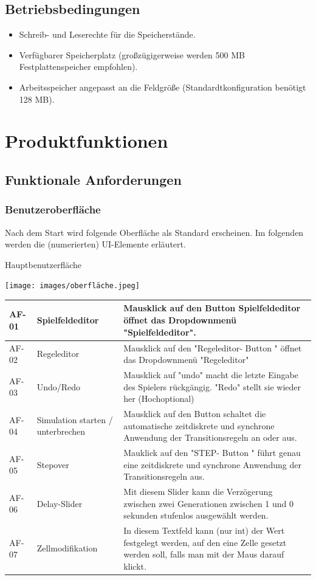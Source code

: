 \documentclass[11pt,a4paper]{article}
\begin{document}
\subsection{Betriebsbedingungen}


\begin{itemize}
    \item Schreib- und Leserechte für die Speicherstände.
    \item Verfügbarer Speicherplatz (großzügigerweise werden 500 MB Festplattenspeicher empfohlen).
    \item Arbeitsspeicher angepasst an die Feldgröße (Standardtkonfiguration benötigt 128 MB).
\end{itemize}

\pagebreak



\section{Produktfunktionen}
\subsection{Funktionale Anforderungen}
\subsubsection{Benutzeroberfläche}
Nach dem Start wird folgende Oberfläche als Standard erscheinen. Im folgenden werden die (numerierten) UI-Elemente erläutert.
\par
Hauptbenutzerfläche
\par
\texttt{[image: images/oberfläche.jpeg]}

\begin{longtable}[m]{|m{2cm}|m{4cm}|m{9cm}|}
\hline
 AF-01 & Spielfeldeditor & Mausklick auf den Button Spielfeldeditor öffnet das Dropdownmenü "Spielfeldeditor".   \\
 \hline
AF-02 & Regeleditor & Mausklick auf den "Regeleditor- Button " öffnet das Dropdownmenü "Regeleditor" \\
 \hline
AF-03& Undo/Redo& Mausklick auf "undo" macht die letzte Eingabe des Spielers rückgängig. "Redo" stellt sie wieder her (Hochoptional) \\
 \hline
 AF-04 & Simulation starten / unterbrechen & Mausklick auf den Button schaltet die automatische zeitdiskrete und synchrone Anwendung der Transitionsregeln an oder aus. \\
 \hline
 AF-05& Stepover & Mauklick auf den "STEP- Button " führt genau eine zeitdiskrete und synchrone Anwendung der Transitionsregeln aus.  \\

\hline
 AF-06 & Delay-Slider & Mit diesem Slider kann die Verzögerung zwischen zwei Generationen zwischen 1 und 0 sekunden stufenlos ausgewählt werden. \\
 \hline
 AF-07 & Zellmodifikation & In diesem Textfeld kann (nur int) der Wert festgelegt werden, auf den eine Zelle gesetzt werden soll, falls man mit der Maus darauf klickt.  \\
\hline
\end{longtable}
\end{document}
